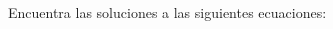 Encuentra las soluciones a las siguientes ecuaciones:

\begin{multicols}{2}
    \begin{parts}
        \part 
        \part 
        \part 
        \part 
        \part 
        \part 
    \end{parts}
\end{multicols}